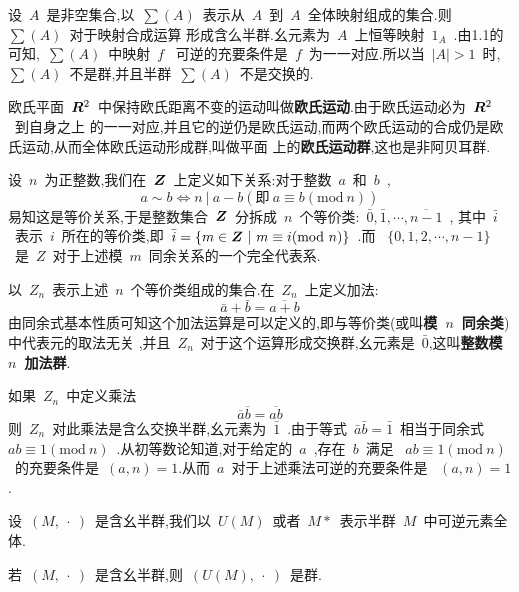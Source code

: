 \begin{example}
    设~$A$~是非空集合,以~$\sum(A)$~表示从~$A$~到~$A$~全体映射组成的集合.则~$\sum(A)$~对于映射合成运算
    形成含么半群.幺元素为~$A$~上恒等映射~$1_A$~.由1.1的可知,~$\sum(A)$~中映射~$f$~
    可逆的充要条件是~$f$~为一一对应.所以当~$|A|>1$~时,~$\sum(A)$~不是群,并且半群~$\sum(A)$~不是交换的.
\end{example}
\begin{example}
    欧氏平面~$\boldsymbol{R}^2$~中保持欧氏距离不变的运动叫做\textbf{欧氏运动}.由于欧氏运动必为~$\boldsymbol{R}^2$~到自身之上
    的一一对应,并且它的逆仍是欧氏运动,而两个欧氏运动的合成仍是欧氏运动,从而全体欧氏运动形成群,叫做平面
    上的\textbf{欧氏运动群},这也是非阿贝耳群.
\end{example}
\begin{example}
    设~$n$~为正整数,我们在~$\boldsymbol{Z}$~上定义如下关系:对于整数~$a$~和~$b$~,
    \begin{equation*}
        a \sim b \Leftrightarrow n~|~a-b(\mbox{即}~a \equiv b(\mathrm{mod}~n)) 
    \end{equation*}
    易知这是等价关系,于是整数集合~$\boldsymbol{Z}$~分拆成~$n$~个等价类:~$\bar{0},\bar{1},\cdots,\overline{n-1}$~,
    其中~$\bar{i}$~表示~$i$~所在的等价类,即~$\bar{i}=\{m \in \boldsymbol{Z}~|~m \equiv i(\mathrm{mod}~n)\}$~.而
    ~$\{0,1,2,\cdots,n-1\}$~是~$Z$~对于上述模~$m$~同余关系的一个完全代表系.\par
    以~$Z_n$~表示上述~$n$~个等价类组成的集合.在~$Z_n$~上定义加法:
    \begin{equation*}
        \bar{a}+\bar{b}=\overline{a+b}
    \end{equation*}
    由同余式基本性质可知这个加法运算是可以定义的,即与等价类(或叫\textbf{模~$n$~同余类})中代表元的取法无关
    ,并且~$Z_n$~对于这个运算形成交换群,幺元素是~$\bar{0}$,这叫\textbf{整数模~$n$~加法群}.\par
    如果~$Z_n$~中定义乘法
    \begin{equation*}
        \overline{a}\overline{b}=\overline{ab}
    \end{equation*}
    则~$Z_n$~对此乘法是含么交换半群,幺元素为~$\bar{1}$~.由于等式~$\bar{a}\bar{b}=\bar{1}$~相当于同余式
    ~$ab \equiv 1(\mathrm{mod}~n)$~.从初等数论知道,对于给定的~$a$~,存在~$b$~满足
    ~$ab \equiv 1(\mathrm{mod}~n)$~的充要条件是~$(a,n)=1$.从而~$a$~对于上述乘法可逆的充要条件是
    ~$(a,n)=1$.
\end{example}
设~$(M,~\cdot~)$~是含幺半群,我们以~$U(M)$~或者~$M*$~表示半群~$M$~中可逆元素全体.
\begin{Definition}
    若~$(M,~\cdot~)$~是含幺半群,则~$(U(M),~\cdot~)$~是群.
\end{Definition}
